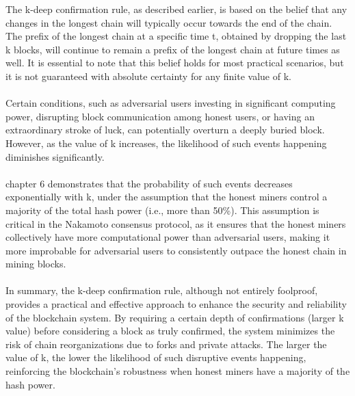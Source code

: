 \documentclass{report}
\begin{document}
The k-deep confirmation rule, as described earlier, is based on the belief that any changes in the longest chain will typically occur towards the end of the chain. The prefix of the longest chain at a specific time t, obtained by dropping the last k blocks, will continue to remain a prefix of the longest chain at future times as well. It is essential to note that this belief holds for most practical scenarios, but it is not guaranteed with absolute certainty for any finite value of k.\\\\
Certain conditions, such as adversarial users investing in significant computing power, disrupting block communication among honest users, or having an extraordinary stroke of luck, can potentially overturn a deeply buried block. However, as the value of k increases, the likelihood of such events happening diminishes significantly.\\\\
chapter 6 demonstrates that the probability of such events decreases exponentially with k, under the assumption that the honest miners control a majority of the total hash power (i.e., more than 50\%). This assumption is critical in the Nakamoto consensus protocol, as it ensures that the honest miners collectively have more computational power than adversarial users, making it more improbable for adversarial users to consistently outpace the honest chain in mining blocks.\\\\
In summary, the k-deep confirmation rule, although not entirely foolproof, provides a practical and effective approach to enhance the security and reliability of the blockchain system. By requiring a certain depth of confirmations (larger k value) before considering a block as truly confirmed, the system minimizes the risk of chain reorganizations due to forks and private attacks. The larger the value of k, the lower the likelihood of such disruptive events happening, reinforcing the blockchain's robustness when honest miners have a majority of the hash power.\\\\
\end{document}
